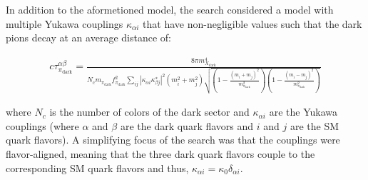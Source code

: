 In addition to the aformetioned model, the search considered a model with multiple Yukawa couplings $\kappa_{\alpha i}$ that have non-negligible values such that the dark pions decay at an average distance of:

\begin{equation}
	\begin{aligned}
		c\tau_{\pi_{\text{dark}}}^{\alpha\beta} = \frac{
		8\pi m_{X_{\text{dark}}}^4
		}{
		N_c m_{\pi_{\text{dark}}}f^2_{\pi_{\text{dark}}} \sum_{ij}|\kappa_{\alpha i}\kappa_{\beta j}^{*}|^2 (m_i^2 + m_j^2) \sqrt{\left(1 - \frac{(m_i + m_j)^2}{m_{\pi_{\text{dark}}}^2}\right)\left(1-\frac{(m_i - m_j)^2}{m_{\pi_{\text{dark}}}^2}\right)}
		}
	\end{aligned}
\end{equation}

where $N_c$ is the number of colors of the dark sector and $\kappa_{\alpha i}$ are the Yukawa couplings (where $\alpha$ and $\beta$ are the dark quark flavors and $i$ and $j$ are the SM quark flavors). A simplifying focus of the search was that the couplings were flavor-aligned, meaning that the three dark quark flavors couple to the corresponding SM quark flavors and thus, $\kappa_{\alpha i} = \kappa_{0}\delta_{\alpha i}$.

